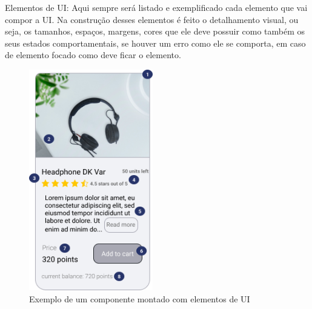 {\newpage
Elementos de UI: Aqui sempre será listado e exemplificado cada elemento que vai compor a UI. Na construção desses elementos é feito o detalhamento visual, ou seja, os tamanhos, espaços, margens, cores que ele deve possuir como também os seus estados comportamentais, se houver um erro como ele se comporta, em caso de elemento focado como deve ficar o elemento.

\begin{figure}
        \begin{center}
    	\includegraphics[width=0.48\textwidth]{images/ui-exemplo.png}
        
        \end{center}
        \caption{Exemplo de um componente montado com elementos de UI}
\end{figure} 

}
